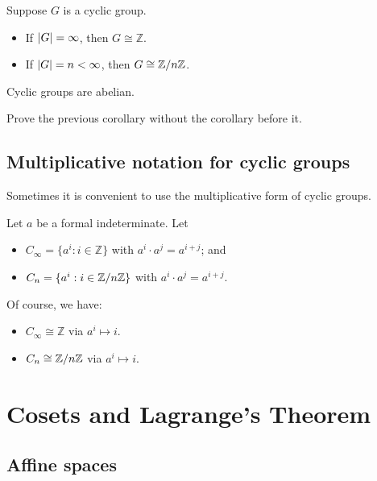 \documentclass[12pt,letterpaper]{report}
\begin{document}
\begin{cor}{}{}
  Suppose $G$ is a cyclic group.
  \begin{itemize}
    \item If $\lvert G\rvert = \infty$, then $G \cong \mathbb{Z}$.
    \item If $\lvert G\rvert = n < \infty$, then $G \cong \mathbb{Z}/{n}\mathbb{Z}$.
  \end{itemize}
\end{cor}

\begin{cor}{}{}
  Cyclic groups are abelian.
\end{cor}

\begin{exer}{}{}
  Prove the previous corollary without the corollary before it.
\end{exer}

\pagebreak
\subsection{Multiplicative notation for cyclic groups}

Sometimes it is convenient to use the multiplicative form of cyclic groups.

\begin{defn}{}{}
  Let $a$ be a formal indeterminate.
  Let
  \begin{itemize}
    \item $C_\infty = \{a^i : i \in \mathbb{Z}\}$ with $a^i \cdot a^j = a^{i + j}$; and
    \item $C_n = \{a^i : i \in \mathbb{Z}/{n}\mathbb{Z}\}$ with $a^i \cdot a^j = a^{i + j}$.
  \end{itemize}
\end{defn}

Of course, we have:
\begin{itemize}
  \item $C_\infty \cong \mathbb{Z}$ via $a^i \mapsto i$.
  \item $C_n \cong \mathbb{Z}/{n}\mathbb{Z}$ via $a^i \mapsto i$.
\end{itemize}


\section{Cosets and Lagrange's Theorem}

\subsection{Affine spaces}
\end{document}
